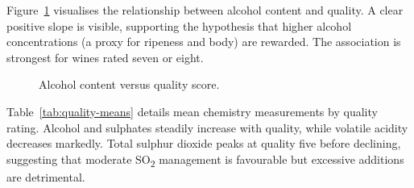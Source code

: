 \documentclass[11pt]{article}
\begin{document}
Figure~\ref{fig:alcohol-quality-scatter} visualises the relationship between
alcohol content and quality. A clear positive slope is visible, supporting the
hypothesis that higher alcohol concentrations (a proxy for ripeness and body)
are rewarded. The association is strongest for wines rated seven or eight.

\begin{figure}[H]
  \centering
  \caption{Alcohol content versus quality score.}
  \label{fig:alcohol-quality-scatter}
\end{figure}

Table~\ref{tab:quality-means} details mean chemistry measurements by quality
rating. Alcohol and sulphates steadily increase with quality, while volatile
acidity decreases markedly. Total sulphur dioxide peaks at quality five before
declining, suggesting that moderate SO\textsubscript{2} management is favourable
but excessive additions are detrimental.
\end{document}
